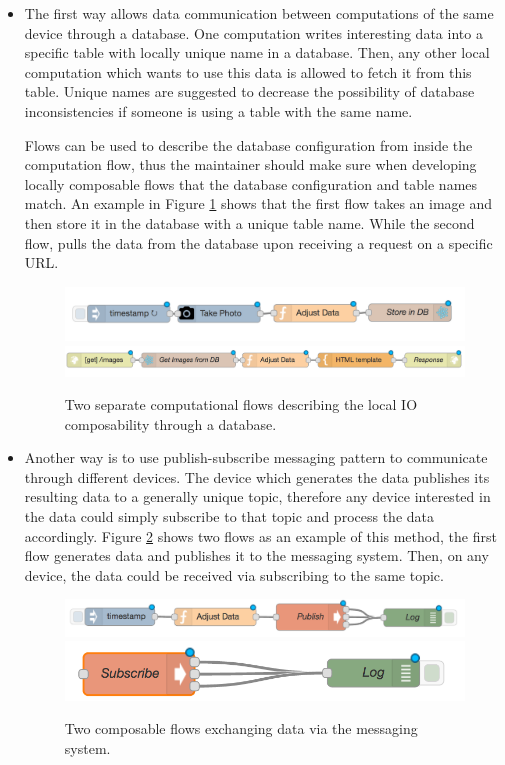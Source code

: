 \begin{itemize}
	\item The first way allows data communication between computations of the same device  through a database. One computation writes interesting data into a specific table with locally unique name in a database. Then, any other local computation which wants to use this data is allowed to fetch it from this table. Unique names are suggested to decrease the possibility of database inconsistencies if someone is using a table with the same name.
	 
	Flows can be used to describe the database configuration from inside the computation flow, thus the maintainer should make sure when developing  locally composable flows that the database configuration and table names match. An example in Figure \ref{fig:db} shows that the first flow takes an image and then store it in the database with a unique table name.  While the second flow, pulls the data from the database upon receiving a request on a specific URL. 
	
	\begin{figure}[H]
		\centering
		\includegraphics[scale=0.5]{images/db-out.png}
		\includegraphics[scale=0.5]{images/db-in.png}
		\caption{Two separate computational flows describing the local IO composability through a database.}
		\label{fig:db}
	\end{figure}
	
	\item Another way is to use  publish-subscribe messaging pattern to communicate through different devices. The device which generates the data publishes its resulting data to a generally unique topic, therefore any device interested in the data could simply subscribe to that topic and process the data accordingly. Figure \ref{fig:scampi} shows two flows as an example of this method, the first flow generates data and publishes it to the messaging system. Then, on any device, the data could be received via subscribing to the same topic.
	
	\begin{figure}[H]
		\centering
		\includegraphics[scale=0.6]{images/SCAMPI-pub.png}
		\includegraphics[scale=0.6]{images/SCAMPI-sub.png}
		\caption{Two composable flows exchanging data via the messaging system.}
		\label{fig:scampi}
	\end{figure}
	

\end{itemize}
